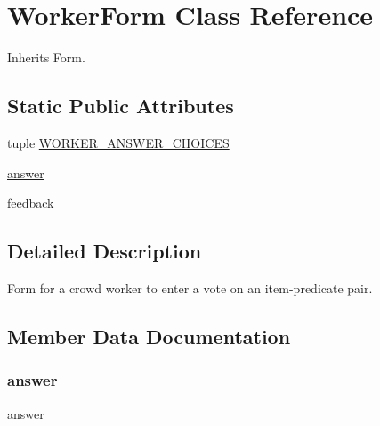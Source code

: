 \hypertarget{classdynamicfilterapp_1_1forms_1_1_worker_form}{}\section{Worker\+Form Class Reference}
\label{classdynamicfilterapp_1_1forms_1_1_worker_form}


Inherits Form.

\subsection*{Static Public Attributes}
\begin{DoxyCompactItemize}
\item 
tuple \hyperlink{classdynamicfilterapp_1_1forms_1_1_worker_form_a82a7fc5c5e889c4eb0460d3f1638425b}{W\+O\+R\+K\+E\+R\+\_\+\+A\+N\+S\+W\+E\+R\+\_\+\+C\+H\+O\+I\+C\+ES}
\item 
\hyperlink{classdynamicfilterapp_1_1forms_1_1_worker_form_a8c4d9ee8d4f82d724070b97e70b9c4e5}{answer}
\item 
\hyperlink{classdynamicfilterapp_1_1forms_1_1_worker_form_aecc50b4643d1ea45de7afe20e729c160}{feedback}
\end{DoxyCompactItemize}


\subsection{Detailed Description}
\begin{DoxyVerb}Form for a crowd worker to enter a vote on an item-predicate pair.
\end{DoxyVerb}
 

\subsection{Member Data Documentation}
\mbox{\label{classdynamicfilterapp_1_1forms_1_1_worker_form_a8c4d9ee8d4f82d724070b97e70b9c4e5}} 
\subsubsection{\texorpdfstring{answer}{answer}}
{\footnotesize\ttfamily answer\hspace{0.3cm}{\ttfamily [static]}}

